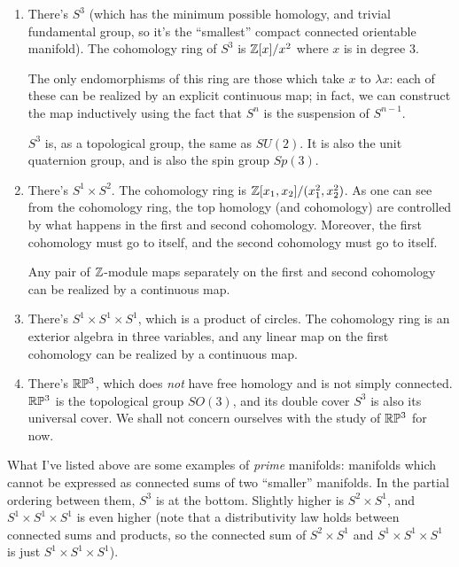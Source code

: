 \documentclass[a4paper]{amsart}
\begin{document}
\begin{enumerate}

\item There's $S^3$ (which has the minimum possible homology, and
  trivial fundamental group, so it's the ``smallest'' compact
  connected orientable manifold). The cohomology ring of $S^3$ is
  $\mathbb{Z}[x]/x^2$ where $x$ is in degree $3$.

  The only endomorphisms of this ring are those which take $x$ to
  $\lambda x$: each of these can be realized by an explicit continuous
  map; in fact, we can construct the map inductively using the fact
  that $S^n$ is the suspension of $S^{n-1}$.

  $S^3$ is, as a topological group, the same as $SU(2)$. It is also
  the unit quaternion group, and is also the spin group $Sp(3)$.

\item There's $S^1 \times S^2$. The cohomology ring is
  $\mathbb{Z}[x_1,x_2]/(x_1^2, x_2^2)$. As one can see from the cohomology
  ring, the top homology (and cohomology) are controlled by what
  happens in the first and second cohomology. Moreover, the first
  cohomology must go to itself, and the second cohomology must go to itself.

  Any pair of $\mathbb{Z}$-module maps separately on the first and second
  cohomology can be realized by a continuous map.

\item There's $S^1 \times S^1 \times S^1$, which is a product of
  circles. The cohomology ring is an exterior algebra in three
  variables, and any linear map on the first cohomology can be
  realized by a continuous map.

\item There's $\mathbb{R}\mathbb{P}^3$, which does {\em not} have free
  homology and is not simply connected. $\mathbb{R}\mathbb{P}^3$ is the
  topological group $SO(3)$, and its double cover $S^3$ is also its
  universal cover. We shall not concern ourselves with the study of
  $\mathbb{R}\mathbb{P}^3$ for now.
\end{enumerate}

What I've listed above are some examples of {\em prime} manifolds:
manifolds which cannot be expressed as connected sums of two
``smaller'' manifolds. In the partial ordering between them, $S^3$ is
at the bottom. Slightly higher is $S^2 \times S^1$, and $S^1 \times
S^1 \times S^1$ is even higher (note that a distributivity law holds
between connected sums and products, so the connected sum of $S^2
\times S^1$ and $S^1 \times S^1 \times S^1$ is just $S^1 \times S^1
\times S^1$).
\end{document}
